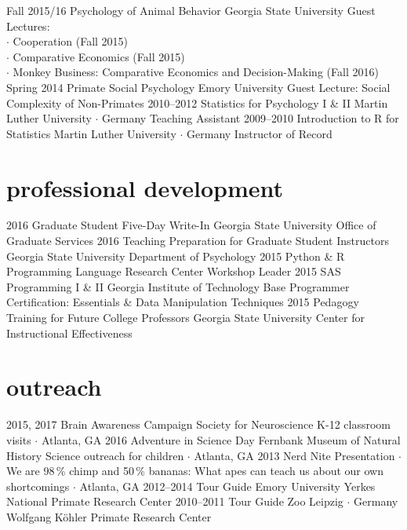 \documentclass[]{friggeri-cv}
\begin{document}
\begin{entrylist}
  \entry
    {Fall 2015/16}
    {Psychology of Animal Behavior}
    {Georgia State University}
    {Guest Lectures:\\ 
    $\cdot$ Cooperation (Fall 2015)\\
    $\cdot$ Comparative Economics (Fall 2015)\\
    $\cdot$ Monkey Business: Comparative Economics and Decision-Making (Fall 2016)}
  \entry
    {Spring 2014}
    {Primate Social Psychology}
    {Emory University}
    {Guest Lecture: Social Complexity of Non-Primates}
  \entry
    {2010--2012}
    {Statistics for Psychology I \& II}
    {Martin Luther University $\cdot$ Germany}
    {Teaching Assistant}
  \entry
    {2009--2010}
    {Introduction to R for Statistics}
    {Martin Luther University $\cdot$ Germany}
    {Instructor of Record}
\end{entrylist}



\section{professional development}

\begin{entrylist}
  \entry
    {2016}
    {Graduate Student Five-Day Write-In}
    {Georgia State University}
    {Office of Graduate Services}
  \entry
    {2016}
    {Teaching Preparation for Graduate Student Instructors}
    {Georgia State University}
    {Department of Psychology}
  \entry
    {2015}
    {Python \& R Programming}
    {Language Research Center}
    {Workshop Leader} %
  \entry
    {2015}
    {SAS Programming I \& II}
    {Georgia Institute of Technology}
    {Base Programmer Certification: Essentials \& Data Manipulation Techniques}
  \entry
    {2015}
    {Pedagogy Training for Future College Professors}
    {Georgia State University}
    {Center for Instructional Effectiveness}
\end{entrylist}


\section{outreach}

\begin{entrylist}
  \entry
    {2015, 2017}
    {Brain Awareness Campaign}
    {Society for Neuroscience}
    {K-12 classroom visits $\cdot$ Atlanta, GA}
  \entry
    {2016}
    {Adventure in Science Day}
    {Fernbank Museum of Natural History}
    {Science outreach for children $\cdot$ Atlanta, GA}
  \entry
    {2013}
    {Nerd Nite}
    {}
    {Presentation $\cdot$ We are 98\,\% chimp and 50\,\% bananas: What apes can teach us about our own shortcomings $\cdot$ Atlanta, GA}
  \entry
    {2012--2014}
    {Tour Guide}
    {Emory University}
    {Yerkes National Primate Research Center}
  \entry
    {2010--2011}
    {Tour Guide}
    {Zoo Leipzig $\cdot$ Germany}
    {Wolfgang K\"{o}hler Primate Research Center}
\end{entrylist}
\end{document}
